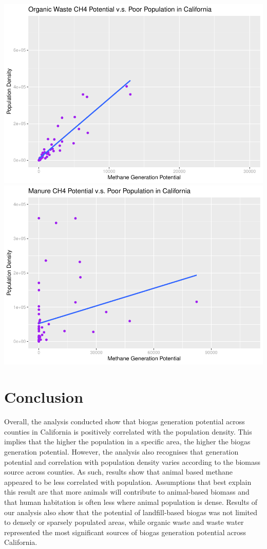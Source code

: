 \documentclass[
  12pt,
]{article}
\begin{document}
\includegraphics{FDR_ProjectReport_files/figure-latex/unnamed-chunk-8-4.pdf}
\includegraphics{FDR_ProjectReport_files/figure-latex/unnamed-chunk-8-5.pdf}

\newpage

\hypertarget{conclusion}{%
\section{Conclusion}\label{conclusion}}

Overall, the analysis conducted show that biogas generation potential
across counties in California is positively correlated with the
population density. This implies that the higher the population in a
specific area, the higher the biogas generation potential. However, the
analysis also recognises that generation potential and correlation with
population density varies according to the biomass source across
counties. As such, results show that animal based methane appeared to be
less correlated with population. Assumptions that best explain this
result are that more animals will contribute to animal-based biomass and
that human habitation is often less where animal population is dense.
Results of our analysis also show that the potential of landfill-based
biogas was not limited to densely or sparsely populated areas, while
organic waste and waste water represented the most significant sources
of biogas generation potential across California.
\end{document}
